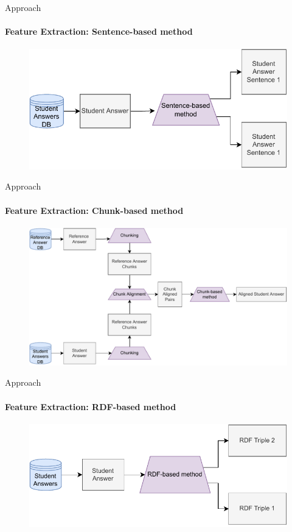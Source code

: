 \documentclass[aspectratio=169]{beamer}
\begin{document}
\begin{frame}{Approach}
\framesubtitle{Feature Extraction: Sentence-based method}
\begin{figure}
	\centering
	\includegraphics[scale = 0.65]{images/sentence_FE_slides.pdf}
	\label{fig:sentence fe slides}
\end{figure}
\end{frame}
\begin{frame}{Approach}
\framesubtitle{Feature Extraction: Chunk-based method}
\begin{figure}
	\centering
	\includegraphics[scale = 0.5]{images/chunk_FE_slides.pdf}
	\label{fig:chunk fe}
\end{figure}
\end{frame}
\begin{frame}{Approach}
\framesubtitle{Feature Extraction: RDF-based method}
\begin{figure}
	\centering
	\includegraphics[scale = 0.65]{images/RDF_FE_slides.pdf}
	\label{fig:rdf fe}
\end{figure}
\end{frame}
\end{document}
